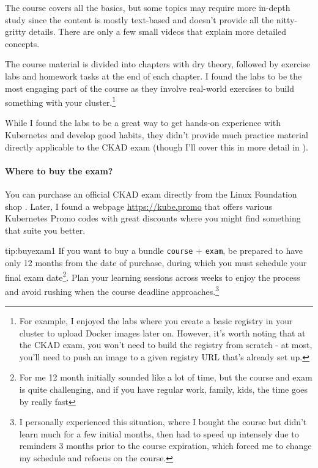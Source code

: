 The course covers all the basics, but some topics may require more in-depth study since the content is mostly text-based and doesn't provide all the nitty-gritty details. There are only a few small videos that explain more detailed concepts.

The course material is divided into chapters with dry theory, followed by exercise labs and homework tasks at the end of each chapter. I found the labs to be the most engaging part of the course as they involve real-world exercises to build something with your cluster.\footnote{For example, I enjoyed the labs where you create a basic registry in your cluster to upload Docker images later on. However, it's worth noting that at the CKAD exam, you won't need to build the registry from scratch - at most, you'll need to push an image to a given registry URL that's already set up.}

While I found the labs to be a great way to get hands-on experience with Kubernetes and develop good habits, they didn't provide much practice material directly applicable to the CKAD exam (though I'll cover this in more detail in ).

\paragraph{Where to buy the exam?} You can purchase an official CKAD exam directly from the Linux Foundation shop . Later, I found a webpage \url{https://kube.promo} that offers various Kubernetes Promo codes with great discounts where you might find something that suite you better.

\begin{tip}{tip:buyexam1}
	If you want to buy a bundle \texttt{course} + \texttt{exam}, be prepared to have only 12 months from the date of purchase, during which you must schedule your final exam date\footnote{For me 12 month initially sounded like a lot of time, but the course and exam is quite challenging, and if you have regular work, family, kids, the time goes by really fast}. Plan your learning sessions across weeks to enjoy the process and avoid rushing when the course deadline approaches.\footnote{I personally experienced this situation, where I bought the course but didn't learn much for a few initial months, then had to speed up intensely due to reminders 3 months prior to the course expiration, which forced me to change my schedule and refocus on the course.}
\end{tip}


